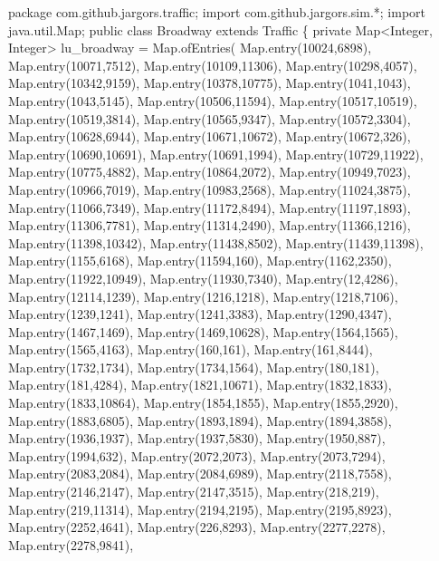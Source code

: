 \nwenddocs{}\endmoddef\nwstartdeflinemarkup\nwenddeflinemarkup
package com.github.jargors.traffic;
import com.github.jargors.sim.*;
import java.util.Map;
public class Broadway extends Traffic \{
  private Map<Integer, Integer> lu_broadway = Map.ofEntries(
    Map.entry(10024,6898),
    Map.entry(10071,7512),
    Map.entry(10109,11306),
    Map.entry(10298,4057),
    Map.entry(10342,9159),
    Map.entry(10378,10775),
    Map.entry(1041,1043),
    Map.entry(1043,5145),
    Map.entry(10506,11594),
    Map.entry(10517,10519),
    Map.entry(10519,3814),
    Map.entry(10565,9347),
    Map.entry(10572,3304),
    Map.entry(10628,6944),
    Map.entry(10671,10672),
    Map.entry(10672,326),
    Map.entry(10690,10691),
    Map.entry(10691,1994),
    Map.entry(10729,11922),
    Map.entry(10775,4882),
    Map.entry(10864,2072),
    Map.entry(10949,7023),
    Map.entry(10966,7019),
    Map.entry(10983,2568),
    Map.entry(11024,3875),
    Map.entry(11066,7349),
    Map.entry(11172,8494),
    Map.entry(11197,1893),
    Map.entry(11306,7781),
    Map.entry(11314,2490),
    Map.entry(11366,1216),
    Map.entry(11398,10342),
    Map.entry(11438,8502),
    Map.entry(11439,11398),
    Map.entry(1155,6168),
    Map.entry(11594,160),
    Map.entry(1162,2350),
    Map.entry(11922,10949),
    Map.entry(11930,7340),
    Map.entry(12,4286),
    Map.entry(12114,1239),
    Map.entry(1216,1218),
    Map.entry(1218,7106),
    Map.entry(1239,1241),
    Map.entry(1241,3383),
    Map.entry(1290,4347),
    Map.entry(1467,1469),
    Map.entry(1469,10628),
    Map.entry(1564,1565),
    Map.entry(1565,4163),
    Map.entry(160,161),
    Map.entry(161,8444),
    Map.entry(1732,1734),
    Map.entry(1734,1564),
    Map.entry(180,181),
    Map.entry(181,4284),
    Map.entry(1821,10671),
    Map.entry(1832,1833),
    Map.entry(1833,10864),
    Map.entry(1854,1855),
    Map.entry(1855,2920),
    Map.entry(1883,6805),
    Map.entry(1893,1894),
    Map.entry(1894,3858),
    Map.entry(1936,1937),
    Map.entry(1937,5830),
    Map.entry(1950,887),
    Map.entry(1994,632),
    Map.entry(2072,2073),
    Map.entry(2073,7294),
    Map.entry(2083,2084),
    Map.entry(2084,6989),
    Map.entry(2118,7558),
    Map.entry(2146,2147),
    Map.entry(2147,3515),
    Map.entry(218,219),
    Map.entry(219,11314),
    Map.entry(2194,2195),
    Map.entry(2195,8923),
    Map.entry(2252,4641),
    Map.entry(226,8293),
    Map.entry(2277,2278),
    Map.entry(2278,9841),
